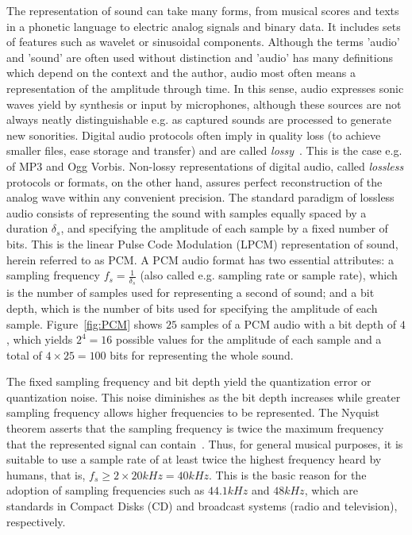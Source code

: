 The representation of sound can take many forms,
from musical scores and texts in a phonetic language to electric analog signals and binary data.
It includes sets of features such as wavelet or sinusoidal components.
Although the terms 'audio' and 'sound' are often used without distinction
and 'audio' has many definitions which depend on the context and the author,
audio most often means a representation of the amplitude through time.
In this sense,
audio expresses sonic waves yield by synthesis or input by microphones,
although these sources are not always neatly distinguishable
e.g. as captured sounds are processed to generate new sonorities.
Digital audio protocols often imply in quality loss (to achieve smaller files, ease storage and transfer)
and are called \emph{lossy}~\cite{loss}.
This is the case e.g. of MP3 and Ogg Vorbis.
Non-lossy representations of digital audio, called \emph{lossless} protocols or formats,
on the other hand, assures perfect reconstruction of the analog wave within any convenient precision.
The standard paradigm of lossless audio consists of
representing the sound with samples equally spaced
by a duration $\delta_s$, and specifying the amplitude of each sample by a fixed number of bits.
This is the linear Pulse Code Modulation (LPCM) representation of sound,
herein referred to as PCM.
A PCM audio format has two essential attributes:
a sampling frequency $f_s=\frac{1}{\delta_s}$ (also called e.g. sampling rate or sample rate),
which is the number of samples used for representing a second of sound;
and a bit depth, which is the number of bits used for specifying the amplitude of each sample.
Figure~\ref{fig:PCM} shows $25$ samples of a PCM audio with a bit depth of $4$,
which yields $2^4=16$ possible values for the amplitude of each sample
and a total of $4 \times 25= 100$ bits for representing the whole sound.

The fixed sampling frequency and bit depth
yield the quantization error or quantization noise.
This noise diminishes as the bit depth increases
while greater sampling frequency allows higher frequencies to be represented.
The Nyquist theorem asserts that the sampling frequency
is twice the maximum frequency that the represented signal can contain~\cite{Openheim}.
Thus, for general musical purposes, it is suitable to use a sample rate of
at least twice the highest frequency heard by humans,
that is, $f_s \geq 2\times 20kHz = 40kHz$.
This is the basic reason for the adoption of sampling frequencies
such as $44.1kHz$ and $48kHz$,
which are standards in Compact Disks (CD)
and broadcast systems (radio and television), respectively.

